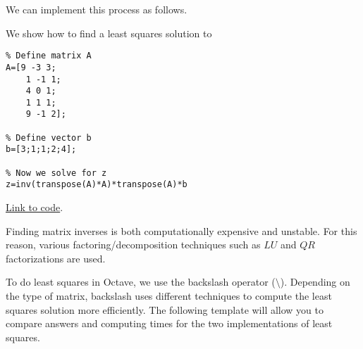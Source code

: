 \documentclass{ximera}
\begin{document}
We can implement this process as follows.

\begin{template}\label{temp:leastSq}
    We show how to find a least squares solution to 

    \begin{verbatim}
% Define matrix A
A=[9 -3 3;
    1 -1 1;
    4 0 1;
    1 1 1; 
    9 -1 2];
        
% Define vector b
b=[3;1;1;2;4];

% Now we solve for z
z=inv(transpose(A)*A)*transpose(A)*b
    \end{verbatim}

\href{https://sagecell.sagemath.org/?z=eJxTVXBJTcvMS1XITSwpyqxQcOTlcrSNtlTQNVYwtublUgACQwVdQwVDKMdEwQDONgRBawUIxxKkyigWKgUCvFyqMMPLUpNL8osUkni5kmyjja0NgdDI2gSkGKTIL79coTxVoTg_pyxVIQ2oroqXq8o2M69Mo6QoMa-4IL84VcNRUwuIUPhJAN_XLTM=&lang=octave&interacts=eJyLjgUAARUAuQ==}{Link to code}.    
\end{template}

\begin{warning}
    Finding matrix inverses is both computationally expensive and unstable.  For this reason, various factoring/decomposition techniques such as $LU$ and $QR$ factorizations are used.  
\end{warning}

To do least squares in Octave, we use the backslash operator ($\setminus$). Depending on the type of matrix, backslash uses different techniques to compute the least squares solution more efficiently.  The following template will allow you to compare answers and computing times for the two implementations of least squares.
\end{document}
